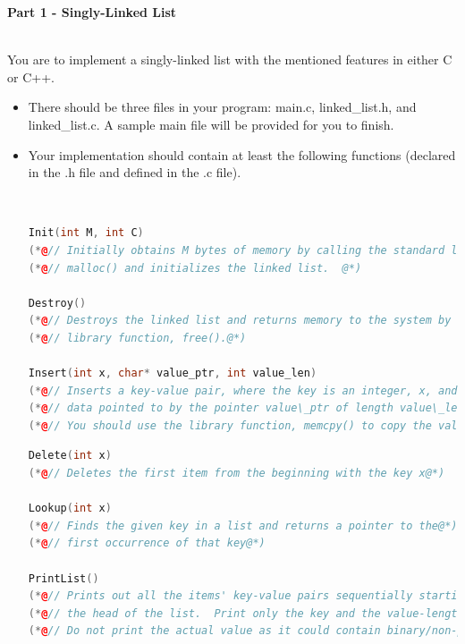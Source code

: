 \documentclass[12pt]{extarticle}
\newenvironment{myindentpar}[1]%
 {\begin{list}{}%
         {\setlength{\leftmargin}{#1}}%
         \item[]%
 }
 {\end{list}}
\begin{document}
\begin{myindentpar}{6.5mm}

    \noindent
    \textbf{Part 1 - Singly-Linked List}

    \ \\
    You are to implement a singly-linked list with the mentioned features in either C or C++.  
    
    \begin{itemize}
        \setlength\itemsep{-0.05em}
    
        \item There should be three files in your program: main.c, linked\_list.h, and linked\_list.c.  A sample main file will be provided for you to finish.  
        \item Your implementation should contain at least the following functions (declared in the .h file and defined in the .c file).

\ \\
\vspace{-5mm}
\begin{lstlisting}[frame=single, language=C++]
Init(int M, int C)
(*@// Initially obtains M bytes of memory by calling the standard library function@*)
(*@// malloc() and initializes the linked list.  @*)

Destroy()
(*@// Destroys the linked list and returns memory to the system by calling another@*)
(*@// library function, free().@*)

Insert(int x, char* value_ptr, int value_len)
(*@// Inserts a key-value pair, where the key is an integer, x, and the value is some@*)
(*@// data pointed to by the pointer value\_ptr of length value\_len.  @*)
(*@// You should use the library function, memcpy() to copy the valu@*)
\end{lstlisting}
    
\begin{lstlisting}[frame=single, language=C++]
Delete(int x)
(*@// Deletes the first item from the beginning with the key x@*)

Lookup(int x)
(*@// Finds the given key in a list and returns a pointer to the@*)
(*@// first occurrence of that key@*)

PrintList()
(*@// Prints out all the items' key-value pairs sequentially starting from@*)
(*@// the head of the list.  Print only the key and the value-length@*)
(*@// Do not print the actual value as it could contain binary/non-printable data@*)
\end{lstlisting}
    

\end{itemize}
\end{myindentpar}
\end{document}
